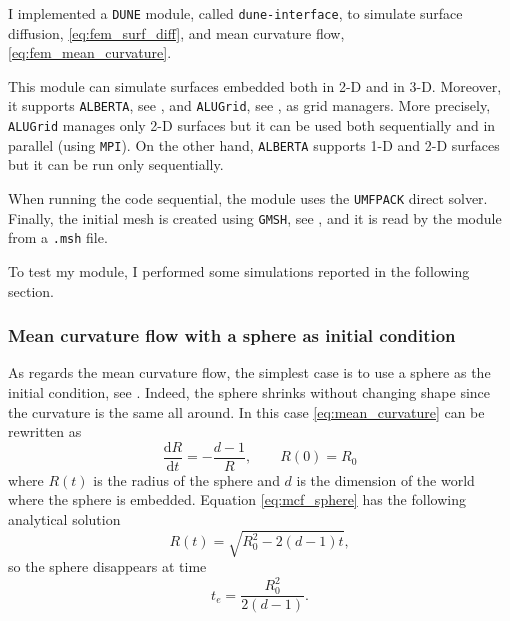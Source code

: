 \documentclass[a4paper,11pt, onecolumn]{article}
\begin{document}
I implemented a \verb|DUNE| module, called \verb|dune-interface|, to simulate surface diffusion, \eqref{eq:fem_surf_diff}, and  mean curvature flow, \eqref{eq:fem_mean_curvature}. 

\noindent This module can simulate surfaces embedded both in 2-D and in 3-D. Moreover, it supports \verb|ALBERTA|, see \cite{Alberta}, and \verb|ALUGrid|, see \cite{alugrid}, as grid managers. More precisely, \verb|ALUGrid| manages only 2-D surfaces but it can be used both sequentially and in parallel (using \verb|MPI|). On the other hand, \verb|ALBERTA| supports 1-D and 2-D surfaces but it can be run only sequentially. 
\newline

\noindent When running the code sequential, the module uses the \verb|UMFPACK| direct solver. Finally, the initial mesh is created using \verb|GMSH|, see \cite{GeuzaineR09}, and it is read by the module from a \verb|.msh| file.
\newline

\noindent To test my module, I performed some simulations reported in the following section.

\subsubsection{Mean curvature flow with a sphere as initial condition}

As regards the mean curvature flow, the simplest case is to use a sphere as the initial condition, see \cite{Ilmanen98}. Indeed, the sphere shrinks without changing shape since the curvature is the same all around. In this case \eqref{eq:mean_curvature} can be rewritten as
\begin{equation}\label{eq:mcf_sphere}
 \frac{\mathrm{d}R}{\mathrm{d}t}=-\frac{d-1}{R},\qquad R(0)=R_0
\end{equation}
where $R(t)$ is the radius of the sphere and $d$ is the dimension of the world where the sphere is embedded. Equation \eqref{eq:mcf_sphere} has the following analytical solution
\begin{equation}\label{eq:mcf_sphere_solution}
 R(t)=\sqrt{R_0^2-2(d-1)t},
\end{equation}
so the sphere disappears at time 
\begin{equation}\label{eq:extinction_time}
 t_{e}=\frac{R_0^2}{2(d-1)}. 
\end{equation}
\end{document}
